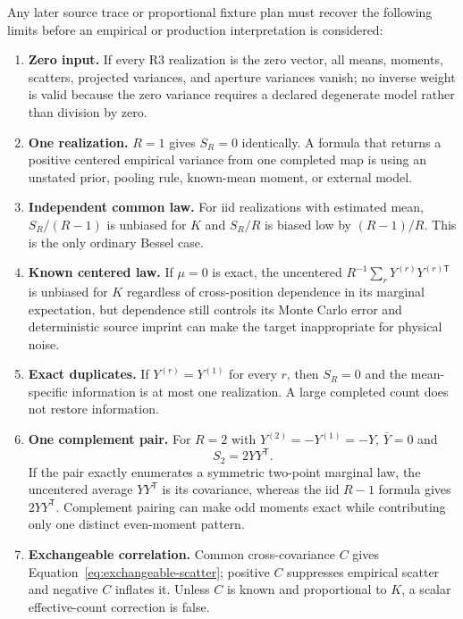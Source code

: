 \documentclass[11pt]{article}
\begin{document}
Any later source trace or proportional fixture plan must recover the following
limits before an empirical or production interpretation is considered:
\begin{enumerate}
\item \textbf{Zero input.}  If every R3 realization is the zero vector, all
means, moments, scatters, projected variances, and aperture variances vanish;
no inverse weight is valid because the zero variance requires a declared
degenerate model rather than division by zero.

\item \textbf{One realization.}  $R=1$ gives $S_R=0$ identically.  A formula
that returns a positive centered empirical variance from one completed map is
using an unstated prior, pooling rule, known-mean moment, or external model.

\item \textbf{Independent common law.}  For iid realizations with estimated
mean, $S_R/(R-1)$ is unbiased for $K$ and $S_R/R$ is biased low by
$(R-1)/R$.  This is the only ordinary Bessel case.

\item \textbf{Known centered law.}  If $\mu=0$ is exact, the uncentered
$R^{-1}\sum_rY^{(r)}Y^{(r)\mathsf T}$ is unbiased for $K$ regardless of
cross-position dependence in its marginal expectation, but dependence still
controls its Monte Carlo error and deterministic source imprint can make the
target inappropriate for physical noise.

\item \textbf{Exact duplicates.}  If $Y^{(r)}=Y^{(1)}$ for every $r$, then
$S_R=0$ and the mean-specific information is at most one realization.  A
large completed count does not restore information.

\item \textbf{One complement pair.}  For $R=2$ with
$Y^{(2)}=-Y^{(1)}= -Y$, $\bar Y=0$ and
\begin{equation}
  S_2=2YY^{\mathsf T}.
  \label{eq:complement-pair-scatter}
\end{equation}
If the pair exactly enumerates a symmetric two-point marginal law, the
uncentered average $YY^{\mathsf T}$ is its covariance, whereas the iid
$R-1$ formula gives $2YY^{\mathsf T}$.  Complement pairing can make odd
moments exact while contributing only one distinct even-moment pattern.

\item \textbf{Exchangeable correlation.}  Common cross-covariance $C$ gives
Equation~\eqref{eq:exchangeable-scatter}; positive $C$ suppresses empirical
scatter and negative $C$ inflates it.  Unless $C$ is known and proportional to
$K$, a scalar effective-count correction is false.


\end{enumerate}
\end{document}

